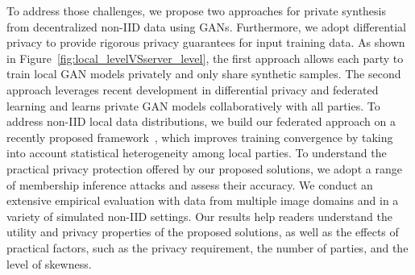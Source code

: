 \documentclass[conference]{IEEEtran}
\begin{document}
To address those challenges, we propose two approaches for private synthesis from decentralized non-IID data using GANs. Furthermore, we adopt differential privacy to provide rigorous privacy guarantees for input training data.  As shown in Figure~\ref{fig:local_levelVSserver_level}, the first approach allows each party to train local GAN models privately and only share synthetic samples.  The second approach leverages recent development in differential privacy and federated learning and learns private GAN models collaboratively with all parties. To address non-IID local data distributions, we build our federated approach on a recently proposed framework~\cite{Fedprox2018}, which improves training convergence by taking into account statistical heterogeneity among local parties.  To understand the practical privacy protection offered by our proposed solutions, we adopt a range of membership inference attacks and assess their accuracy.  We conduct an extensive empirical evaluation with data from multiple image domains and in a variety of simulated non-IID settings. Our results help readers understand the utility and privacy properties of the proposed solutions, as well as the effects of practical factors, such as the privacy requirement, the number of parties, and the level of skewness.   


 
 
\end{document}
